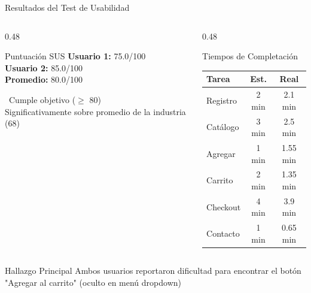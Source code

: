 \documentclass[aspectratio=169]{beamer}
\begin{document}
\begin{frame}{Resultados del Test de Usabilidad}
\begin{columns}[T]
\begin{column}{0.48\textwidth}
\begin{block}{Puntuación SUS}
\textbf{Usuario 1:} 75.0/100 \\
\textbf{Usuario 2:} 85.0/100 \\
\vspace{0.2cm}
\textbf{Promedio:} \textcolor{successgreen}{80.0/100}
\end{block}

\vspace{0.3cm}

\textcolor{successgreen}{\faCheckCircle~Cumple objetivo} ($\geq$ 80) \\
Significativamente sobre promedio de la industria (68)
\end{column}

\begin{column}{0.48\textwidth}
\begin{block}{Tiempos de Completación}
\small
\begin{tabular}{lcc}
\textbf{Tarea} & \textbf{Est.} & \textbf{Real} \\
\midrule
Registro & 2 min & 2.1 min \\
Catálogo & 3 min & 2.5 min \\
Agregar & 1 min & 1.55 min \\
Carrito & 2 min & 1.35 min \\
Checkout & 4 min & 3.9 min \\
Contacto & 1 min & 0.65 min \\
\bottomrule
\end{tabular}
\end{block}
\end{column}
\end{columns}

\vspace{0.3cm}

\begin{alertblock}{Hallazgo Principal}
Ambos usuarios reportaron dificultad para encontrar el botón "Agregar al carrito" (oculto en menú dropdown)
\end{alertblock}
\end{frame}
\end{document}

